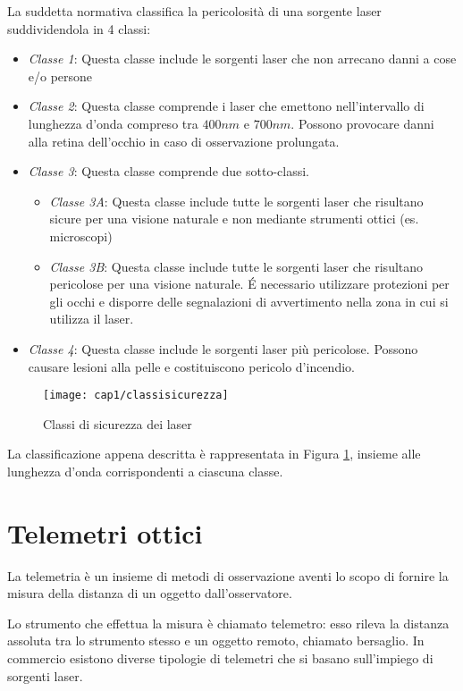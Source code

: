 La suddetta normativa classifica la pericolosità di una sorgente laser suddividendola in 4 classi:
\begin{itemize}
	\item \emph{Classe 1}: Questa classe include le sorgenti laser che non arrecano danni a cose e/o persone
	\item \emph{Classe 2}: Questa classe comprende i laser che emettono nell'intervallo di lunghezza d'onda compreso tra $400nm$ e $700nm$. Possono provocare danni alla retina dell'occhio in caso di osservazione prolungata.
	\item \emph{Classe 3}: Questa classe comprende due sotto-classi.
		\begin{itemize}
		\item \emph{Classe 3A}: Questa classe include tutte le sorgenti laser che risultano sicure per una visione naturale e non mediante strumenti ottici (es. microscopi)
		\item \emph{Classe 3B}: Questa classe include tutte le sorgenti laser che risultano pericolose per una visione naturale. \'E necessario utilizzare protezioni per gli occhi e disporre delle segnalazioni di avvertimento nella zona in cui si utilizza il laser. 
		\end{itemize}
	\item \emph{Classe 4}: Questa classe include le sorgenti laser più pericolose. Possono causare lesioni alla pelle e costituiscono pericolo d'incendio. 
\end{itemize}
\begin{figure}[H] 
  \begin{center}
    \texttt{[image: cap1/classisicurezza]}
    \caption{Classi di sicurezza dei laser}
    \label{classisicurezza}
  \end{center}
\end{figure}
La classificazione appena descritta è rappresentata in Figura \ref{classisicurezza}, insieme alle lunghezza d'onda corrispondenti a ciascuna classe.

\section{Telemetri ottici}
La telemetria è un insieme di metodi di osservazione aventi lo scopo di fornire la misura della distanza di un oggetto dall'osservatore.

Lo strumento che effettua la misura è chiamato telemetro: esso rileva la distanza assoluta tra lo strumento stesso e un oggetto remoto, chiamato bersaglio. In commercio esistono diverse tipologie di telemetri che si basano sull'impiego di sorgenti laser.

